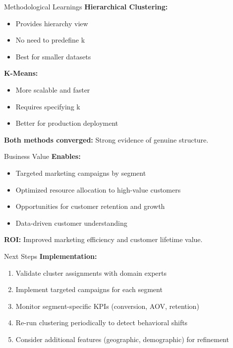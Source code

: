 \documentclass[aspectratio=169,ignorenonframetext]{beamer}
\begin{document}
\begin{frame}{Methodological Learnings}
\textbf{Hierarchical Clustering:}

\begin{itemize}
\item
  Provides hierarchy view
\item
  No need to predefine k
\item
  Best for smaller datasets
\end{itemize}

\textbf{K-Means:}

\begin{itemize}
\item
  More scalable and faster
\item
  Requires specifying k
\item
  Better for production deployment
\end{itemize}

\textbf{Both methods converged:} Strong evidence of genuine structure.
\end{frame}

\begin{frame}{Business Value}
\textbf{Enables:}

\begin{itemize}
\item
  Targeted marketing campaigns by segment
\item
  Optimized resource allocation to high-value customers
\item
  Opportunities for customer retention and growth
\item
  Data-driven customer understanding
\end{itemize}

\textbf{ROI:} Improved marketing efficiency and customer lifetime value.
\end{frame}

\begin{frame}{Next Steps}
\textbf{Implementation:}

\begin{enumerate}
\item
  Validate cluster assignments with domain experts
\item
  Implement targeted campaigns for each segment
\item
  Monitor segment-specific KPIs (conversion, AOV, retention)
\item
  Re-run clustering periodically to detect behavioral shifts
\item
  Consider additional features (geographic, demographic) for refinement
\end{enumerate}
\end{frame}
\end{document}
